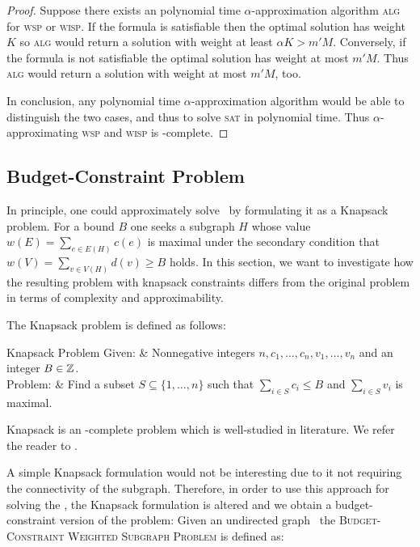 \begin{proof}
	Suppose there exists an polynomial time $\alpha$-approximation algorithm \textsc{alg} for \textsc{wsp} or \textsc{wisp}. If the formula is satisfiable then the optimal solution has weight $K$ so \textsc{alg} would return a solution with weight at least $\alpha K > m'M$. Conversely, if the formula is not satisfiable the optimal solution has weight at most $m'M$. Thus \textsc{alg} would return a solution with weight at most $m'M$, too.\medskip
	
	In conclusion, any polynomial time $\alpha$-approximation algorithm would be able to distinguish the two cases, and thus to solve \textsc{sat} in polynomial time. Thus $\alpha$-approximating \textsc{wsp} and \textsc{wisp} is \NP-complete.\medskip
\end{proof}

\subsection{Budget-Constraint Problem}
\label{sec:approximation:budget}

In principle, one could approximately solve \maxWSP\ by formulating it as a Knapsack problem. For a bound $B$ one seeks a subgraph $H$ whose value $w(E) = \sum_{e \in E(H)} c(e)$ is maximal under the secondary condition that $w(V) = \sum_{v \in V(H)} d(v) \geq B$ holds. In this section, we want to investigate how the resulting problem with knapsack constraints differs from the original problem in terms of complexity and approximability.\medskip

The Knapsack problem is defined as follows:

\begin{problembox}[framed]{Knapsack Problem}
	Given: & Nonnegative integers $n, c_1, \ldots, c_n, v_1, \ldots, v_n$ and an integer $B \in \mathbb{Z}$.\\
	Problem: & Find a subset $S \subseteq \{1, \ldots, n\}$ such that $\sum_{i \in S} c_i \leq B$ and $\sum_{i \in S} v_i$ is maximal.
	\label{problem:knapsack}
\end{problembox}\vspace{1em}

Knapsack is an \NP-complete problem which is well-studied in literature. We refer the reader to \cite{AMO93}.\medskip

A simple Knapsack formulation would not be interesting due to it not requiring the connectivity of the subgraph. Therefore, in order to use this approach for solving the \WSP, the Knapsack formulation is altered and we obtain a budget-constraint version of the problem: Given an undirected graph \ugraph\ the \textsc{Budget-Constraint Weighted Subgraph Problem} is defined as:


